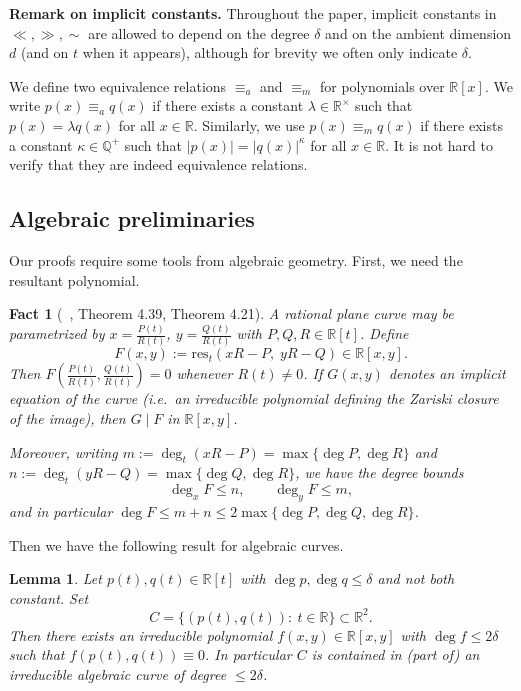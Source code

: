 \documentclass[12pt,reqno]{amsart}
\numberwithin{equation}{section}
\newtheorem{fact}{Fact}[section]
\newtheorem{lemma}[theorem]{Lemma}
\begin{document}
\par\noindent
\textbf{Remark on implicit constants.}
Throughout the paper, implicit constants in $\ll,\gg,\sim$ are allowed to depend on the degree $\delta$ and on the ambient dimension $d$
(and on $t$ when it appears), although for brevity we often only indicate $\delta$.

We define two equivalence relations $\equiv_{a}$ and $\equiv_{m}$ for polynomials over $\mathbb{R}[x]$. We write $p(x) \equiv_{a} q(x)$ if there exists a constant $\lambda\in\mathbb R^\times $ such that $p(x)=\lambda q(x)$ for all $x\in\mathbb{R}$. Similarly, we use $p(x) \equiv_{m} q(x)$ if there exists a constant $\kappa\in\mathbb{Q}^{+} $ such that $|p(x)|=|q(x)|^\kappa$ for all $x\in\mathbb{R}$. It is not hard to verify that they are indeed equivalence relations.

\subsection{Algebraic preliminaries}
Our proofs require some tools from algebraic geometry. First, we need the resultant polynomial.



\begin{fact}[~\cite{sendra2008rational}, Theorem 4.39, Theorem 4.21]\label{fact:resultant}
A rational plane curve may be parametrized by
$x=\frac{P(t)}{R(t)}$, $y=\frac{Q(t)}{R(t)}$
with $P,Q,R\in\mathbb R[t]$.
Define
$$F(x,y):=\mathrm{res}_t(xR-P,\;yR-Q)\in\mathbb R[x,y].$$
Then $F\!\left(\frac{P(t)}{R(t)},\frac{Q(t)}{R(t)}\right)=0$ whenever $R(t)\neq 0$.
If $G(x,y)$ denotes an implicit equation of the curve (i.e.\ an irreducible polynomial defining the
Zariski closure of the image), then $G\mid F$ in $\mathbb R[x,y]$.

Moreover, writing $m:=\deg_t(xR-P)=\max\{\deg P,\deg R\}$ and
$n:=\deg_t(yR-Q)=\max\{\deg Q,\deg R\}$, we have the degree bounds
\[
\deg_x F\le n,\qquad \deg_y F\le m,
\]
and in particular $\deg F\le m+n\le 2\max\{\deg P,\deg Q,\deg R\}$.
\end{fact}






Then we have the following result for algebraic curves.

\begin{lemma}\label{lem:curve}
Let $p(t),q(t)\in\mathbb R[t]$ with $\deg p,\deg q\le \delta$ and not both constant.
Set $$C=\{(p(t),q(t)):\ t\in\mathbb R\}\subset\mathbb R^2.$$
Then there exists an irreducible polynomial $f(x,y)\in\mathbb R[x,y]$ with $\deg f\leq 2\delta$
such that $f(p(t),q(t))\equiv 0$. In particular $C$ is contained in (part of) an irreducible
algebraic curve of degree $\leq 2\delta$.
\end{lemma}
\end{document}
